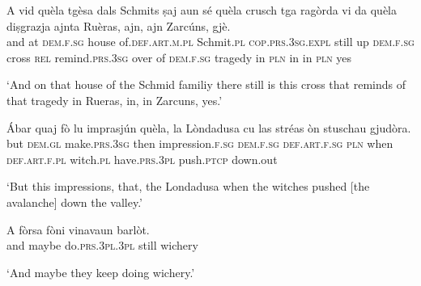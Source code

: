 \begin{linenumbers}
\gll    A vid quèla tgèsa dals Schmits ṣaj aun sé quèla crusch tga ragòrda vi da quèla diṣgrazja ajnta Ruèras, ajn, ajn Zarcúns, gjè.\\
and at \textsc{dem.f.sg} house of.\textsc{def.art.m.pl} Schmit.\textsc{pl} \textsc{cop.prs.3sg.expl} still up \textsc{dem.f.sg} cross \textsc{rel} remind.\textsc{prs.3sg} over of \textsc{dem.f.sg} tragedy in \textsc{pln} in in \textsc{pln} yes\\
\end{linenumbers}
\medskip
\glt `And on that house of the Schmid familiy there still is this cross that reminds of that tragedy in Rueras, in, in Zarcuns, yes.'
\medskip

\begin{linenumbers}
\gll    Ábar quaj fò lu imprasjún quèla, la Lòndadusa cu las stréas òn stuschau gjudòra.\\
but \textsc{dem.gl} make.\textsc{prs.3sg} then impression.\textsc{f.sg} \textsc{dem.f.sg} \textsc{def.art.f.sg} \textsc{pln} when \textsc{def.art.f.pl} witch.\textsc{pl}  have.\textsc{prs.3pl} push.\textsc{ptcp} down.out \\
\end{linenumbers}
\medskip
\glt `But this impressions, that, the Londadusa when the witches pushed [the avalanche] down the valley.'
\medskip

\begin{linenumbers} 
\gll    A fòrsa fòni vinavaun barlòt. \\
and maybe do.\textsc{prs.3pl.3pl} still wichery\\
\end{linenumbers}
\medskip
\glt `And maybe they keep doing wichery.'
\medskip

